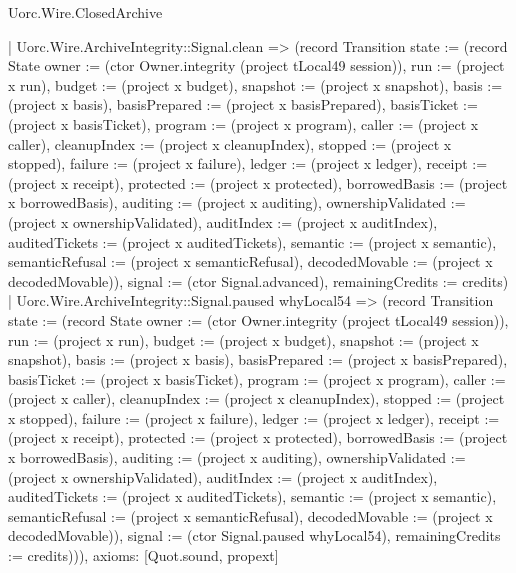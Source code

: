 \begin{lexlean}{Uorc.Wire.ClosedArchive}
\begin{semanticmodule}
{    | Uorc.Wire.ArchiveIntegrity::Signal.clean => (record Transition {state := (record State {owner := (ctor Owner.integrity (project tLocal49 session)), run := (project x run), budget := (project x budget), snapshot := (project x snapshot), basis := (project x basis), basisPrepared := (project x basisPrepared), basisTicket := (project x basisTicket), program := (project x program), caller := (project x caller), cleanupIndex := (project x cleanupIndex), stopped := (project x stopped), failure := (project x failure), ledger := (project x ledger), receipt := (project x receipt), protected := (project x protected), borrowedBasis := (project x borrowedBasis), auditing := (project x auditing), ownershipValidated := (project x ownershipValidated), auditIndex := (project x auditIndex), auditedTickets := (project x auditedTickets), semantic := (project x semantic), semanticRefusal := (project x semanticRefusal), decodedMovable := (project x decodedMovable)}), signal := (ctor Signal.advanced), remainingCredits := credits})
    | Uorc.Wire.ArchiveIntegrity::Signal.paused whyLocal54 => (record Transition {state := (record State {owner := (ctor Owner.integrity (project tLocal49 session)), run := (project x run), budget := (project x budget), snapshot := (project x snapshot), basis := (project x basis), basisPrepared := (project x basisPrepared), basisTicket := (project x basisTicket), program := (project x program), caller := (project x caller), cleanupIndex := (project x cleanupIndex), stopped := (project x stopped), failure := (project x failure), ledger := (project x ledger), receipt := (project x receipt), protected := (project x protected), borrowedBasis := (project x borrowedBasis), auditing := (project x auditing), ownershipValidated := (project x ownershipValidated), auditIndex := (project x auditIndex), auditedTickets := (project x auditedTickets), semantic := (project x semantic), semanticRefusal := (project x semanticRefusal), decodedMovable := (project x decodedMovable)}), signal := (ctor Signal.paused whyLocal54), remainingCredits := credits}))),
  axioms: [Quot.sound, propext]
}


\end{semanticmodule}
\end{lexlean}
